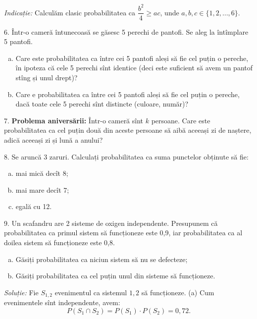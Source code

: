 \documentclass[12pt,a4paper]{article}
\theoremstyle{dotless}
\theoremstyle{dotlessdr}
\begin{document}
\emph{Indicație:} Calculăm clasic probabilitatea ca $ \dfrac{b^2}{4} \geq ac $,
unde $ a, b, c \in \{ 1, 2, \dots, 6 \} $.

\vspace{1cm}

6. Într-o cameră întunecoasă se găsesc 5 perechi de pantofi. Se aleg la întîmplare
5 pantofi.

\begin{enumerate}[(a)]
\item Care este probabilitatea ca între cei 5 pantofi aleși să fie cel puțin o pereche,
  în ipoteza că cele 5 perechi sînt identice (deci este suficient să avem un pantof
  stîng și unul drept)?
\item Care e probabilitatea ca între cei 5 pantofi aleși să fie cel puțin o pereche,
  dacă toate cele 5 perechi sînt distincte (culoare, număr)?
\end{enumerate}

\vspace{1cm}

7. \textbf{Problema aniversării:} Într-o cameră sînt $ k $ persoane. Care este
probabilitatea ca cel puțin două din aceste persoane să aibă aceeași zi de naștere,
adică aceeași zi și lună a anului?

\vspace{1cm}

8. Se aruncă 3 zaruri. Calculați probabilitatea ca suma punctelor obținute să fie:
\begin{enumerate}[(a)]
\item mai mică decît 8;
\item mai mare decît 7;
\item egală cu 12.
\end{enumerate}

\vspace{1cm}

9. Un scafandru are 2 sisteme de oxigen independente. Presupunem că
probabilitatea ca primul sistem să funcționeze este 0,9, iar probabilitatea ca
al doilea sistem să funcționeze este 0,8.
\begin{enumerate}[(a)]
\item Găsiți probabilitatea ca niciun sistem să nu se defecteze;
\item Găsiți probabilitatea ca cel puțin unul din sisteme să funcționeze.
\end{enumerate}

\emph{Soluție:} Fie $ S_{1,2} $ evenimentul ca sistemul $ 1, 2 $ să funcționeze.
(a) Cum evenimentele sînt independente, avem:
\[
  P(S_1 \cap S_2) = P(S_1) \cdot P(S_2) = 0,72.
\]
\end{document}
